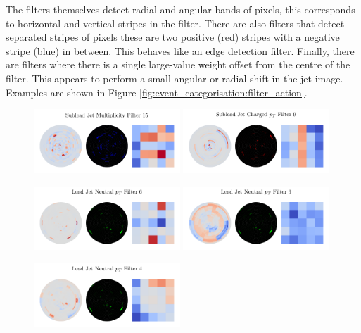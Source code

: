 The filters themselves detect radial and angular bands of pixels, this corresponds to horizontal and vertical stripes in the filter. 
There are also filters that detect separated stripes of pixels these are two positive (red) stripes with a negative stripe (blue) in between. This behaves like an edge detection filter. 
Finally, there are filters where there is a single large-value weight offset from the centre of the filter. This appears to perform a small angular or radial shift in the jet image. 
Examples are shown in Figure \ref{fig:event_categorisation:filter_action}.
\begin{figure}[h!]
    \begin{center}
        \includegraphics[width=0.49\textwidth]{figures/event_selection/ggh_firstconv_5_15.pdf}
        \includegraphics[width=0.49\textwidth]{figures/event_selection/ggh_firstconv_3_9.pdf}
    \end{center}
    \begin{center}
        \includegraphics[width=0.49\textwidth]{figures/event_selection/ggh_firstconv_1_6.pdf}
        \includegraphics[width=0.49\textwidth]{figures/event_selection/ggh_firstconv_1_3.pdf}
    \end{center}
    \begin{center}
        \includegraphics[width=0.49\textwidth]{figures/event_selection/ggh_firstconv_1_4.pdf}

\end{center}
\end{figure}
